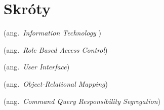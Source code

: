 % 
\chapter*{Skróty}
\label{sec:skroty}
\noindent\vspace{-\topsep-\partopsep-\parsep} %
\begin{description}[labelwidth=*]
  \item [IT] (ang.\ \emph{Information Technology })
  \item [RBAC] (ang.\ \emph{Role Based Access Control})
  \item [UI] (ang.\ \emph{User Interface})
  \item [ORM] (ang.\ \emph{Object-Relational Mapping})
  \item [CQRS] (ang.\ \emph{Command Query Responsibility Segregation})
\end{description}
